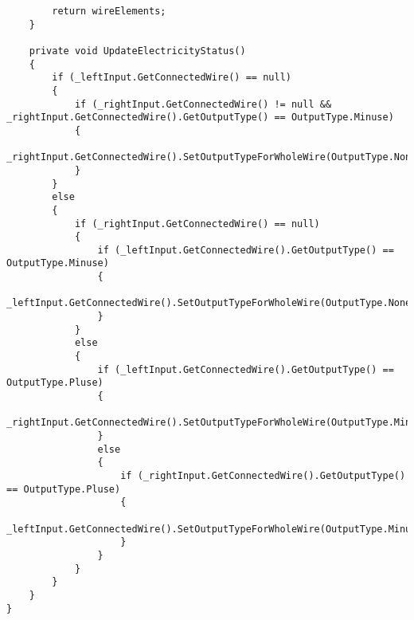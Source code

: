 \begin{verbatim}
        return wireElements;
    }

    private void UpdateElectricityStatus()
    {
        if (_leftInput.GetConnectedWire() == null)
        {
            if (_rightInput.GetConnectedWire() != null && _rightInput.GetConnectedWire().GetOutputType() == OutputType.Minuse)
            {
                _rightInput.GetConnectedWire().SetOutputTypeForWholeWire(OutputType.None);
            }
        }
        else
        {
            if (_rightInput.GetConnectedWire() == null)
            {
                if (_leftInput.GetConnectedWire().GetOutputType() == OutputType.Minuse)
                {
                    _leftInput.GetConnectedWire().SetOutputTypeForWholeWire(OutputType.None);
                }
            }
            else
            {
                if (_leftInput.GetConnectedWire().GetOutputType() == OutputType.Pluse)
                {
                    _rightInput.GetConnectedWire().SetOutputTypeForWholeWire(OutputType.Minuse);
                }
                else
                {
                    if (_rightInput.GetConnectedWire().GetOutputType() == OutputType.Pluse)
                    {
                        _leftInput.GetConnectedWire().SetOutputTypeForWholeWire(OutputType.Minuse);
                    }
                }
            }
        }
    }
}

\end{verbatim}
